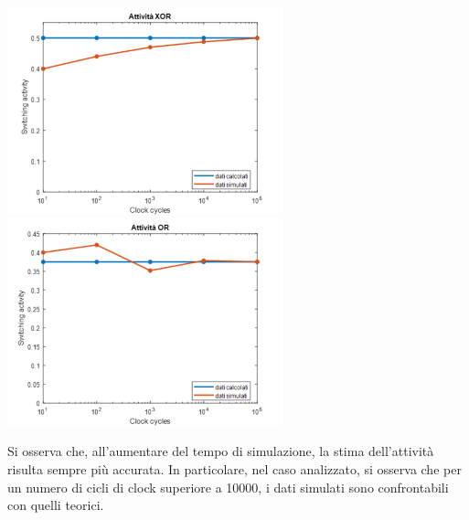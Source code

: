 \documentclass[11pt,  english, makeidx, a4paper, titlepage, oneside]{book}
\begin{document}
\centerline{\includegraphics[width=8cm]{./img/Lab_1/Es_1/XOR.png}
            \includegraphics[width=8cm]{./img/Lab_1/Es_1/OR.png}}
\vspace{0.5cm}
Si osserva che, all'aumentare del tempo di simulazione, la stima 
dell'attività risulta sempre più accurata. In particolare, 
nel caso analizzato, si osserva che per un numero di cicli di clock 
superiore a 10000, i dati simulati sono confrontabili con quelli teorici.
\newpage
\end{document}
